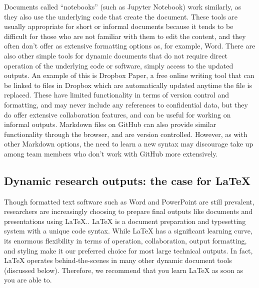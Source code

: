 Documents called ``notebooks'' 
(such as Jupyter Notebook) 
work similarly,
as they also use the underlying code that create the document.
These tools are usually appropriate for short or informal documents
because it tends to be difficult for those who are not familiar with them to edit the content,
and they often don't offer as extensive formatting options as, for example, Word.
There are also other simple tools for dynamic documents
that do not require direct operation of the underlying code or software,
simply access to the updated outputs.
An example of this is Dropbox Paper,
a free online writing tool that can be linked to files in Dropbox
which are automatically updated anytime the file is replaced.
These have limited functionality in terms of version control and formatting,
and may never include any references to confidential data,
but they do offer extensive collaboration features,
and can be useful for working on informal outputs.
Markdown files on GitHub can also provide similar functionality through the browser,
and are version controlled.
However, as with other Markdown options, the need to learn a new syntax may
discourage take up among team members who don't work with GitHub more extensively.

\subsection{Dynamic research outputs: the case for {\LaTeX}}

Though formatted text software such as Word and PowerPoint are still prevalent,
researchers are increasingly choosing to prepare final outputs
like documents and presentations using {\LaTeX}.\index{{\LaTeX}}.
{\LaTeX} is a document preparation and typesetting system with a unique code syntax.
While {\LaTeX} has a significant learning curve,
its enormous flexibility in terms of operation, collaboration, output formatting, and styling
make it our preferred choice for most large technical outputs.
In fact, {\LaTeX} operates behind-the-scenes in many other dynamic document tools (discussed below).
Therefore, we recommend that you learn {\LaTeX} as soon as you are able to.

